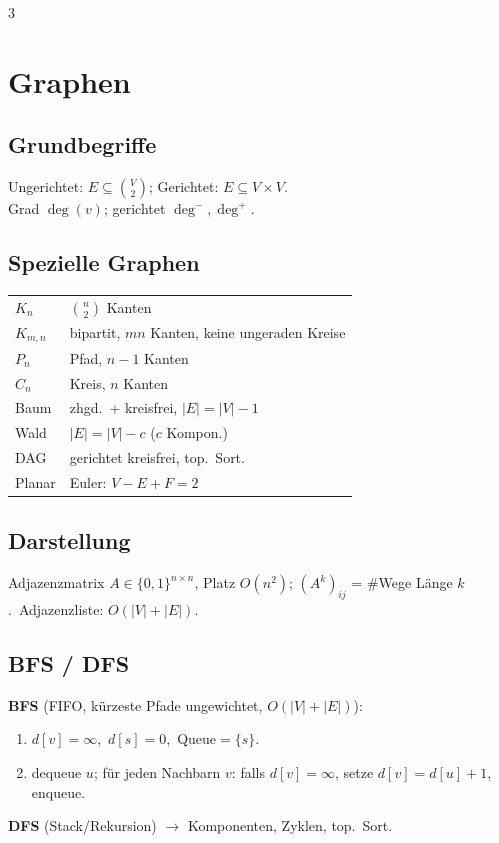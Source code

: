 \documentclass[8pt,a4paper]{extarticle}
\begin{document}
\begin{multicols*}{3}
\section{Graphen}
\subsection{Grundbegriffe}
Ungerichtet: $E\!\subseteq\!\binom{V}{2}$; Gerichtet: $E\!\subseteq\!V{\times}V$.\\
Grad $\deg(v)$; gerichtet $\deg^-,\deg^+$.

\subsection{Spezielle Graphen}
\begin{tabularx}{\linewidth}{@{}l@{\ }X@{}}
$K_n$ & $\binom{n}{2}$ Kanten \\
$K_{m,n}$ & bipartit, $mn$ Kanten, keine ungeraden Kreise \\
$P_n$ & Pfad, $n{-}1$ Kanten \\
$C_n$ & Kreis, $n$ Kanten \\
Baum & zhgd.\ + kreisfrei, $|E|{=}|V|{-}1$ \\
Wald & $|E|{=}|V|{-}c$ ($c$ Kompon.) \\
DAG & gerichtet kreisfrei, top.\ Sort. \\
Planar & Euler: $V{-}E{+}F{=}2$ \\
\end{tabularx}

\subsection{Darstellung}
Adjazenzmatrix $A{\in}\{0,1\}^{n\times n}$, Platz $O(n^2)$; $(A^k)_{ij}$ = \#Wege L\"ange $k$.\ Adjazenzliste: $O(|V|{+}|E|)$.

\subsection{BFS / DFS}
\textbf{BFS} (FIFO, k\"urzeste Pfade ungewichtet, $O(|V|{+}|E|)$):
\begin{enumerate}
\item $d[v]{=}\infty$,\ $d[s]{=}0$,\ Queue${=}\{s\}$.
\item dequeue $u$; f\"ur jeden Nachbarn $v$: falls $d[v]{=}\infty$, setze $d[v]{=}d[u]{+}1$, enqueue.
\end{enumerate}
\textbf{DFS} (Stack/Rekursion) $\to$ Komponenten, Zyklen, top.\ Sort.


\end{multicols*}
\end{document}
